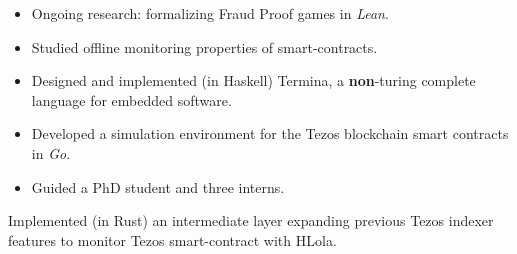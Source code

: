 
    \begin{itemize}
        \item Ongoing research: formalizing Fraud Proof games in \emph{Lean}.
        \item Studied offline monitoring properties of smart-contracts.
        \item Designed and implemented (in Haskell) Termina, a
            \textbf{non}-turing complete language for embedded software.
        \item Developed a simulation environment for the Tezos blockchain smart contracts in \emph{Go}.
        \item Guided a PhD student and three interns.
    \end{itemize}

    \divider

        Implemented (in Rust) an intermediate layer expanding previous
            Tezos indexer features to monitor Tezos smart-contract with HLola.

    \divider

